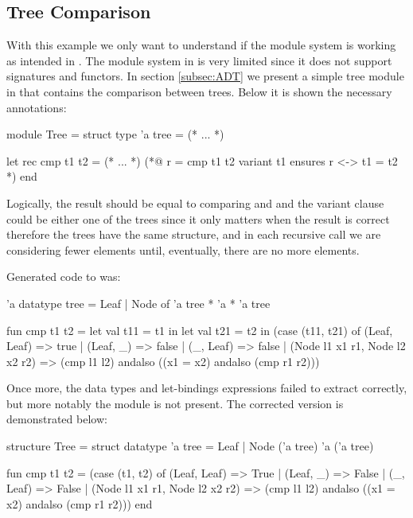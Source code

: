\subsection{Tree Comparison}

With this example we only want to understand if the module system is working as intended in \cml. The module system in \cml is very 
limited since it does not support signatures and functors. In section \ref{subsec:ADT} we present a simple tree module in \ocaml that 
contains the comparison between trees. Below it is shown the necessary \gospel annotations:

\begin{gospell}
module Tree = struct
  type 'a tree = (* ... *)

  let rec cmp t1 t2 = (* ... *)
  (*@
  r = cmp t1 t2
  variant t1
  ensures r <-> t1 = t2
  *)
end
\end{gospell}

Logically, the result should be equal to comparing  and  and the variant clause could be either one of 
the trees since it only matters when the result is correct therefore the trees have the same structure, and in each recursive call we
are considering fewer elements until, eventually, there are no more elements.

Generated code to \cml was:

\begin{cakeml}
'a datatype tree = Leaf | Node of 'a tree * 'a * 'a tree

fun cmp t1 t2 = let val t11 = t1 in
  let val t21 = t2 in
  (case (t11, t21) of
    (Leaf, Leaf) => true
  | (Leaf, _) => false
  | (_, Leaf) => false
  | (Node l1 x1 r1, Node l2 x2 r2) =>
    (cmp l1 l2) andalso ((x1 = x2) andalso (cmp r1 r2)))
\end{cakeml}

Once more, the data types and let-bindings expressions failed to extract correctly, but more notably the module is not present.
The corrected version is demonstrated below:

\begin{cakeml}
structure Tree = struct
  datatype 'a tree = Leaf | Node ('a tree) 'a ('a tree)

  fun cmp t1 t2 =
  (case (t1, t2) of
    (Leaf, Leaf) => True
  | (Leaf, _) => False
  | (_, Leaf) => False
  | (Node l1 x1 r1, Node l2 x2 r2) =>
      (cmp l1 l2) andalso ((x1 = x2) andalso (cmp r1 r2)))
end
\end{cakeml}

